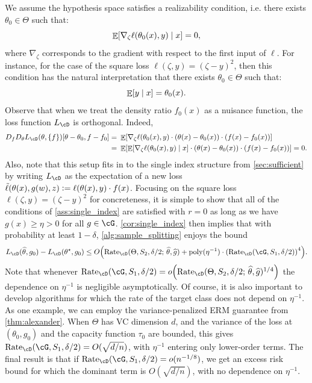\documentclass[11pt]{article} %
\newcommand{\pref}[1]{\cref{#1}}
\theoremstyle{theorem}  %
\theoremstyle{plain}
\DeclarePairedDelimiter{\brk}{[}{]}
\DeclarePairedDelimiter{\crl}{\{}{\}}
\DeclarePairedDelimiter{\prn}{(}{)}
\DeclareMathOperator{\En}{\mathbb{E}}
\newcommand{\ls}{\ell}
\newcommand{\ldef}{\vcentcolon=}
\newcommand{\wh}[1]{\widehat{#1}}
\newcommand{\midsem}{;\,}
\newcommand{\poprisk}{L_{\cD}}
\newcommand{\estone}{\wh{g}}
\newcommand{\esttwo}{\wh{\theta}}
\newcommand{\nuisance}{\cG}
\newcommand{\target}{\Theta}
\newcommand{\Rate}{\mathrm{Rate}_{\cD}}
\newcommand{\besttwo}{\theta^{\star}}
\newcommand{\gtone}{g_0}
\newcommand{\sampleone}{S_1}
\newcommand{\sampletwo}{S_2}
\begin{document}
We assume the hypothesis space satisfies a realizability condition, i.e. there exists $\theta_0\in \target$ such that:
\begin{equation}
\En\brk*{\nabla_{\zeta} \ell(\theta_0(x), y) \mid x}=0,
\end{equation}
where $\nabla_\zeta$ corresponds to the gradient with respect to the first input of $\ell$. For instance, for the case of the square loss $\ell(\zeta, y) = (\zeta - y)^2$, then this condition has the natural interpretation that there exists $\theta_0\in\target$ such that:
\begin{equation}
\En\brk*{y\mid x} = \theta_0(x).
\end{equation}
Observe that when we treat the density ratio $f_0(x)$ as a nuisance function, the loss function $\poprisk$ is orthogonal. Indeed,
\begin{align*}
D_f D_\theta \poprisk(\theta, \crl{f})[\theta - \theta_0, f - f_0] =~& \En\brk*{\nabla_{\zeta} \ell(\theta_0(x), y) \cdot (\theta(x) - \theta_0(x)) \cdot (f(x) - f_0(x))}\\
=~&\En\brk*{\En\brk{\nabla_{\zeta} \ell(\theta_0(x), y)\mid x} \cdot (\theta(x) - \theta_0(x)) \cdot (f(x) - f_0(x))} = 0.
\end{align*}
Also, note that this setup fits in to the single index structure from \pref{sec:sufficient} by writing $\poprisk$ as the expectation of a new loss $\tilde{\ls}(\theta(x),g(w),z)\ldef{}\ls(\theta(x),y)\cdot{}f(x)$. Focusing on the square loss $\ls(\zeta,y)=(\zeta-y)^{2}$ for concreteness, it is simple to show that all of the conditions of \pref{ass:single_index} are satisfied with $r=0$ as long as we have $g(x)\geq{}\eta>0$ for all $g\in\nuisance$. \pref{cor:single_index} then implies that with probability at least $1-\delta$, \pref{alg:sample_splitting} enjoys the bound
\[
\poprisk(\esttwo,\gtone) - \poprisk(\besttwo,\gtone)
\leq{} O\prn*{\Rate(\target, \sampletwo, \delta/2\midsem{}\esttwo,\estone) 
+ \mathrm{poly}(\eta^{-1})\cdot\prn*{\Rate(\nuisance,\sampleone,\delta/2)}^{4}
}.
\]
Note that whenever $\Rate(\nuisance,\sampleone,\delta/2)=o\prn*{\Rate(\target, \sampletwo, \delta/2\midsem{}\esttwo,\estone)^{1/4}}$ the dependence on $\eta^{-1}$ is negligible asymptotically. Of course, it is also important to develop algorithms for which the rate of the target class does not depend on $\eta^{-1}$. As one example, we can employ the variance-penalized ERM guarantee from \pref{thm:alexander}. When $\target$ has VC dimension $d$, and the variance of the loss at $(\theta_0,g_0)$ and the capacity function $\tau_0$ are bounded, this gives $\Rate(\nuisance,\sampleone,\delta/2)=O(\sqrt{d/n})$, with $\eta^{-1}$ entering only lower-order terms. The final result is that if $\Rate(\nuisance,\sampleone,\delta/2)=o(n^{-1/8})$, we get an excess risk bound for which the dominant term is $O(\sqrt{d/n})$, with no dependence on $\eta^{-1}$. 
\end{document}
